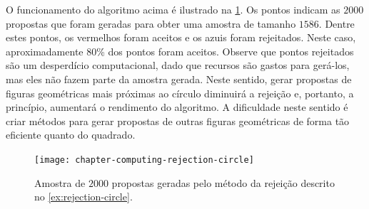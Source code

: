 \begin{example}
 O funcionamento do algoritmo acima é ilustrado na
 \cref{fig:rejection-circle}.
 Os pontos indicam as $2000$ propostas que foram
 geradas para obter uma amostra de tamanho $1586$.
 Dentre estes pontos, os vermelhos foram aceitos e
 os azuis foram rejeitados.
 Neste caso, aproximadamente 80\% dos pontos
 foram aceitos. Observe que pontos rejeitados são
 um desperdício computacional, dado que
 recursos são gastos para gerá-los, mas eles não
 fazem parte da amostra gerada.
 Neste sentido, gerar propostas de
 figuras geométricas mais próximas ao círculo
 diminuirá a rejeição e, portanto, a princípio,
 aumentará o rendimento do algoritmo.
 A dificuldade neste sentido é criar métodos para
 gerar propostas de  outras figuras geométricas de
 forma tão eficiente quanto do quadrado.
 \begin{figure}
  \centering
  \texttt{[image: chapter-computing-rejection-circle]}
  \caption{Amostra de $2000$ propostas geradas pelo
  método da rejeição descrito
  no \cref{ex:rejection-circle}.}
  \label{fig:rejection-circle}
 \end{figure}
\end{example}

